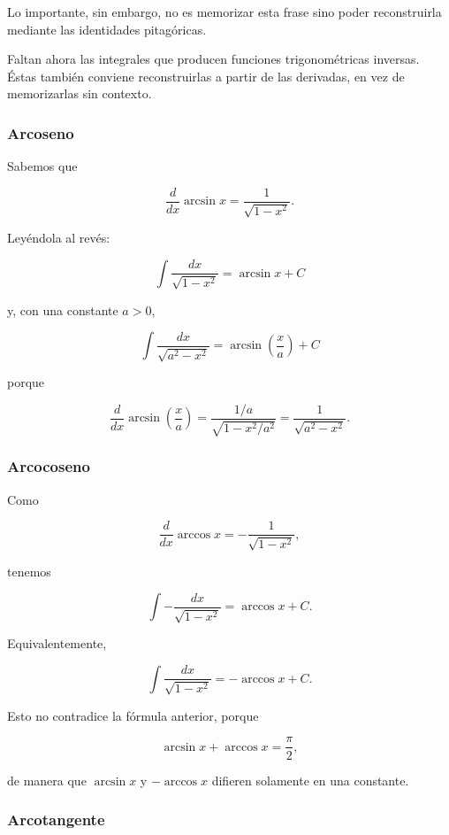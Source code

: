 \documentclass[12pt]{article}
\theoremstyle{definition}
\theoremstyle{remark}
\begin{document}
Lo importante, sin embargo, no es memorizar esta frase sino poder reconstruirla
mediante las identidades pitagóricas.

Faltan ahora las integrales que producen funciones trigonométricas
inversas. Éstas también conviene reconstruirlas a partir de las
derivadas, en vez de memorizarlas sin contexto.

\subsubsection*{Arcoseno}

Sabemos que

\[
\frac{d}{dx}\arcsin x
=
\frac{1}{\sqrt{1-x^2}}.
\]

Leyéndola al revés:

\[
\boxed{
\int\frac{dx}{\sqrt{1-x^2}}
=
\arcsin x+C
}
\]

y, con una constante \(a>0\),

\[
\boxed{
\int\frac{dx}{\sqrt{a^2-x^2}}
=
\arcsin\left(\frac{x}{a}\right)+C
}
\]

porque

\[
\frac{d}{dx}
\arcsin\left(\frac{x}{a}\right)
=
\frac{1/a}{\sqrt{1-x^2/a^2}}
=
\frac{1}{\sqrt{a^2-x^2}}.
\]

\subsubsection*{Arcocoseno}

Como

\[
\frac{d}{dx}\arccos x
=
-\frac{1}{\sqrt{1-x^2}},
\]

tenemos

\[
\boxed{
\int-\frac{dx}{\sqrt{1-x^2}}
=
\arccos x+C
}.
\]

Equivalentemente,

\[
\int\frac{dx}{\sqrt{1-x^2}}
=
-\arccos x+C.
\]

Esto no contradice la fórmula anterior, porque

\[
\arcsin x+\arccos x=\frac{\pi}{2},
\]

de manera que \(\arcsin x\) y \(-\arccos x\) difieren solamente
en una constante.

\subsubsection*{Arcotangente}
\end{document}
